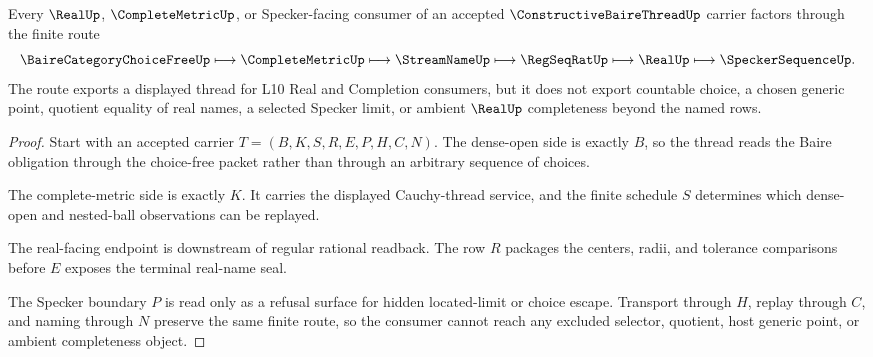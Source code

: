 \begin{theorem}
\label{thm:constructive-baire-thread-nonescape}
Every $\RealUp$, $\CompleteMetricUp$, or Specker-facing consumer of an accepted $\ConstructiveBaireThreadUp$ carrier factors through the finite route
$$
\BaireCategoryChoiceFreeUp
\longmapsto
\CompleteMetricUp
\longmapsto
\StreamNameUp
\longmapsto
\RegSeqRatUp
\longmapsto
\RealUp
\longmapsto
\SpeckerSequenceUp .
$$
The route exports a displayed thread for L10 Real and Completion consumers, but it does not export countable choice, a chosen generic point, quotient equality of real names, a selected Specker limit, or ambient $\RealUp$ completeness beyond the named rows.
\end{theorem}
\begin{proof}
Start with an accepted carrier $T=(B,K,S,R,E,P,H,C,N)$. The dense-open side is exactly $B$, so the thread reads the Baire obligation through the choice-free packet rather than through an arbitrary sequence of choices.

The complete-metric side is exactly $K$. It carries the displayed Cauchy-thread service, and the finite schedule $S$ determines which dense-open and nested-ball observations can be replayed.

The real-facing endpoint is downstream of regular rational readback. The row $R$ packages the centers, radii, and tolerance comparisons before $E$ exposes the terminal real-name seal.

The Specker boundary $P$ is read only as a refusal surface for hidden located-limit or choice escape. Transport through $H$, replay through $C$, and naming through $N$ preserve the same finite route, so the consumer cannot reach any excluded selector, quotient, host generic point, or ambient completeness object.
\end{proof}

\begin{closurestatus}{\ConstructiveBaireThreadUp}
  \theoryclosure{\seedClosure}
  \formalstatus{\unformalizedV}
\end{closurestatus}
